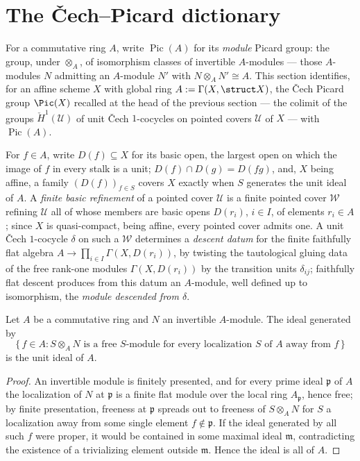 \section{The \v Cech--Picard dictionary}

For a commutative ring \(A\), write \(\operatorname{Pic}(A)\) for its \emph{module} Picard
group: the group, under \(\otimes_A\), of isomorphism classes of invertible \(A\)-modules
--- those \(A\)-modules \(N\) admitting an \(A\)-module \(N'\) with \(N \otimes_A N' \cong A\).
This section identifies, for an affine scheme \(X\) with global ring \(A := \Gamma(X,\struct
X)\), the \v Cech Picard group \(\Pic(X)\) recalled at the head of the previous section ---
the colimit of the groups \(\check H^1(\mathcal U)\) of unit \v Cech \(1\)-cocycles on pointed
covers \(\mathcal U\) of \(X\) --- with \(\operatorname{Pic}(A)\).

For \(f \in A\), write \(D(f) \subseteq X\) for its basic open, the largest open on which the
image of \(f\) in every stalk is a unit; \(D(f) \cap D(g) = D(fg)\), and, \(X\) being affine, a
family \((D(f))_{f \in S}\) covers \(X\) exactly when \(S\) generates the unit ideal of \(A\).
A \emph{finite basic refinement} of a pointed cover \(\mathcal U\) is a finite pointed cover
\(\mathcal W\) refining \(\mathcal U\) all of whose members are basic opens \(D(r_i)\),
\(i \in I\), of elements \(r_i \in A\); since \(X\) is quasi-compact, being affine, every
pointed cover admits one. A unit \v Cech \(1\)-cocycle \(\delta\) on such a \(\mathcal W\)
determines a \emph{descent datum} for the finite faithfully flat algebra
\(A \to \prod_{i \in I} \Gamma(X, D(r_i))\), by twisting the tautological gluing data of the
free rank-one modules \(\Gamma(X,D(r_i))\) by the transition units \(\delta_{ij}\); faithfully
flat descent produces from this datum an \(A\)-module, well defined up to isomorphism, the
\emph{module descended from \(\delta\)}.

\begin{theorem}
  \label{pa-thm:invertible_span_free}
  \leanok

  Let \(A\) be a commutative ring and \(N\) an invertible \(A\)-module. The ideal generated by
  \[
    \{\, f \in A : S \otimes_A N \text{ is a free } S\text{-module for every localization } S
    \text{ of } A \text{ away from } f \,\}
  \]
  is the unit ideal of \(A\).
\end{theorem}
\begin{proof}
  \leanok
  An invertible module is finitely presented, and for every prime ideal \(\mathfrak p\) of
  \(A\) the localization of \(N\) at \(\mathfrak p\) is a finite flat module over the local
  ring \(A_{\mathfrak p}\), hence free; by finite presentation, freeness at \(\mathfrak p\)
  spreads out to freeness of \(S \otimes_A N\) for \(S\) a localization away from some single
  element \(f \notin \mathfrak p\). If the ideal generated by all such \(f\) were proper, it
  would be contained in some maximal ideal \(\mathfrak m\), contradicting the existence of a
  trivializing element outside \(\mathfrak m\). Hence the ideal is all of \(A\).
\end{proof}

